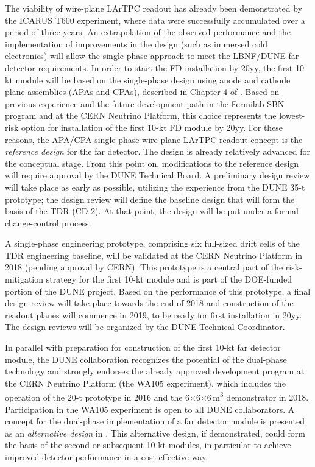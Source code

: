 The viability of wire-plane LArTPC readout has already been demonstrated by the ICARUS T600 
experiment, where data were successfully accumulated over a period of three years. 
An extrapolation of the observed performance and the implementation of improvements 
in the design (such as immersed cold electronics) will allow the single-phase 
approach to meet the LBNF/DUNE far detector requirements. In order to start the FD installation
by 20yy, %
the first 10-kt module will be based on the single-phase design using anode and cathode
plane assemblies (APAs and CPAs), described in Chapter 4 of \voldune. 
Based on previous experience and the 
future development path in the Fermilab SBN program and at the CERN Neutrino Platform, 
this choice represents the lowest-risk option for installation of the first 10-kt FD module by 
20yy. %
For these reasons, the APA/CPA single-phase wire plane LArTPC readout 
concept %
is the \textit{reference design} 
for the far detector. 
The design is already relatively advanced for the conceptual  
stage. From this point on, modifications to the reference design will require approval
by the DUNE Technical Board. A preliminary design review will take place as early 
as possible, utilizing the experience from the DUNE 35-t prototype; the design 
review will define the baseline design that will form the basis of the TDR (CD-2). 
At that point, the design will be put under a formal change-control 
process. 

A single-phase engineering prototype,
comprising six full-sized drift cells of the TDR engineering baseline,
will be validated at the CERN Neutrino Platform in 2018 (pending approval by CERN). 
This %
prototype is a central part of the risk-mitigation 
strategy for the first 10-kt module and is part of the DOE-funded portion of the DUNE project. 
Based on the  performance of this prototype, %
a final design review will 
take place towards the end of 2018 and construction of the readout planes will 
commence in 2019, to be ready for first installation in 20yy. %
The design reviews 
will be organized by the DUNE Technical Coordinator. 

In parallel with preparation for construction of the first 10-kt far detector module, 
the DUNE collaboration recognizes the potential of the dual-phase technology and 
strongly endorses the already approved development program at the CERN Neutrino 
Platform (the WA105 experiment), which includes the operation of the 20-t prototype 
in 2016 and the 6$\times$6$\times$6\,m\textsuperscript{3} demonstrator in 2018. Participation 
in the WA105 experiment is open to all DUNE collaborators. A concept for the dual-phase 
implementation of a far detector module is presented as an \textit{alternative 
design} in \voldune. This alternative design, if demonstrated, 
could form the basis of the second or subsequent 10-kt modules, in 
particular to achieve improved detector performance in a cost-effective way. 

